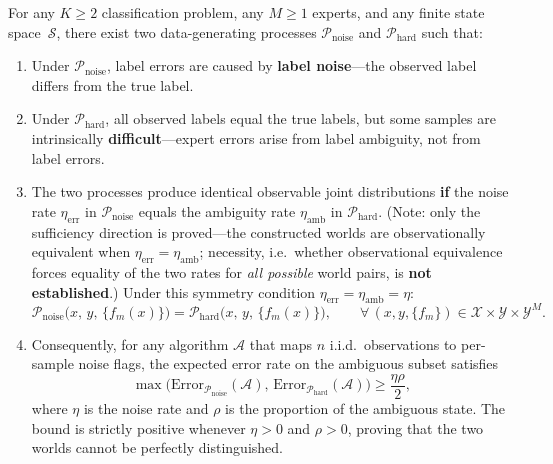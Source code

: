 \begin{theorem}
  \label{thm:unidentifiability}
  For any $K \ge 2$ classification problem, any $M \ge 1$ experts, and any finite
  state space~$\mathcal{S}$, there exist two data-generating processes
  $\mathcal{P}_{\text{noise}}$ and $\mathcal{P}_{\text{hard}}$ such that:
  \begin{enumerate}[label=(\roman*)]
    \item Under $\mathcal{P}_{\text{noise}}$, label errors are caused by
      \textbf{label noise}---the observed label differs from the true label.
    \item Under $\mathcal{P}_{\text{hard}}$, all observed labels equal the true
      labels, but some samples are intrinsically
      \textbf{difficult}---expert errors arise from label ambiguity, not from
      label errors.
    \item The two processes produce identical observable joint distributions
      \textbf{if} the noise rate $\eta_{\text{err}}$ in $\mathcal{P}_{\text{noise}}$
      equals the ambiguity rate $\eta_{\text{amb}}$ in $\mathcal{P}_{\text{hard}}$.
      (Note: only the sufficiency direction is proved---the constructed worlds
      are observationally equivalent when $\eta_{\text{err}}=\eta_{\text{amb}}$;
      necessity, i.e.\ whether observational equivalence forces equality of the
      two rates for \emph{all possible} world pairs, is \textbf{not established}.)
      Under this symmetry condition $\eta_{\text{err}} = \eta_{\text{amb}} = \eta$:
      \[
      \mathcal{P}_{\text{noise}}\bigl(x,\,y,\,\{f_m(x)\}\bigr)
      = \mathcal{P}_{\text{hard}}\bigl(x,\,y,\,\{f_m(x)\}\bigr),
      \qquad \forall\,(x,y,\{f_m\}) \in \mathcal{X}\times\mathcal{Y}\times\mathcal{Y}^M.
      \]
    \item Consequently, for any algorithm $\mathcal{A}$ that maps $n$ i.i.d.\
      observations to per-sample noise flags, the expected error rate on the
      ambiguous subset satisfies
      \[
      \max\bigl(\mathrm{Error}_{\mathcal{P}_{\text{noise}}}(\mathcal{A}),\,
             \mathrm{Error}_{\mathcal{P}_{\text{hard}}}(\mathcal{A})\bigr)
      \ge \frac{\eta\rho}{2},
      \]
      where $\eta$ is the noise rate and $\rho$ is the proportion of the
      ambiguous state.  The bound is strictly positive whenever $\eta>0$ and
      $\rho>0$, proving that the two worlds cannot be perfectly distinguished.
  \end{enumerate}
\end{theorem}

